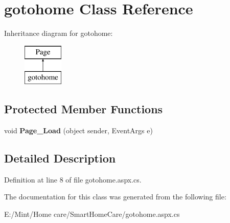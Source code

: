 \hypertarget{classgotohome}{\section{gotohome Class Reference}
\label{classgotohome}
}
Inheritance diagram for gotohome\-:\begin{figure}[H]
\begin{center}
\leavevmode
\includegraphics[height=2.000000cm]{classgotohome}
\end{center}
\end{figure}
\subsection*{Protected Member Functions}
\begin{DoxyCompactItemize}
\item 
\hypertarget{classgotohome_a16d750c3dd9dfe3208a39b2a8a5dea91}{void {\bfseries Page\-\_\-\-Load} (object sender, Event\-Args e)}\label{classgotohome_a16d750c3dd9dfe3208a39b2a8a5dea91}

\end{DoxyCompactItemize}


\subsection{Detailed Description}


Definition at line 8 of file gotohome.\-aspx.\-cs.



The documentation for this class was generated from the following file\-:\begin{DoxyCompactItemize}
\item 
E\-:/\-Mint/\-Home care/\-Smart\-Home\-Care/gotohome.\-aspx.\-cs\end{DoxyCompactItemize}
